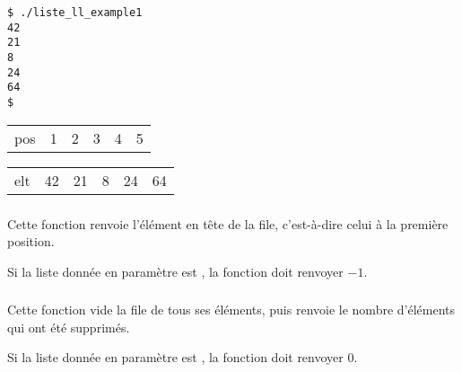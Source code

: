 \begin{table}[ht!]
  \centering
  \begin{minipage}{0.45\textwidth}
    \centering

\lstset{language=sh}
\begin{lstlisting}[frame=single]
$ ./liste_ll_example1
42
21
8
24
64
$
\end{lstlisting}

  \end{minipage}
  \hfillx
  \begin{minipage}{0.45\textwidth}
    \centering

\begin{tabular}{m{1cm} C{0.5cm} C{0.5cm} C{0.5cm} C{0.5cm} C{0.5cm} }
pos & 1 & 2 & 3 & 4 & 5 \\
\end{tabular}

\begin{tabular}{m{1cm}|C{0.5cm}|C{0.5cm}|C{0.5cm}|C{0.5cm}|C{0.5cm}|}
elt & 42 & 21 & 8 & 24 & 64 \\
\end{tabular}

  \end{minipage}
\end{table}

\vspace*{-0.5cm}


\subsubsection*{}

\noindent Cette fonction renvoie l'élément en tête de la file, c'est-à-dire celui à la première position.

\smallskip

\noindent Si la liste donnée en paramètre est , la fonction doit renvoyer $ -1 $.

\bigskip


\subsubsection*{}

\noindent Cette fonction vide la file de tous ses éléments, puis renvoie le nombre d'éléments qui ont été supprimés.

\smallskip

\noindent Si la liste donnée en paramètre est , la fonction doit renvoyer $ 0 $.
